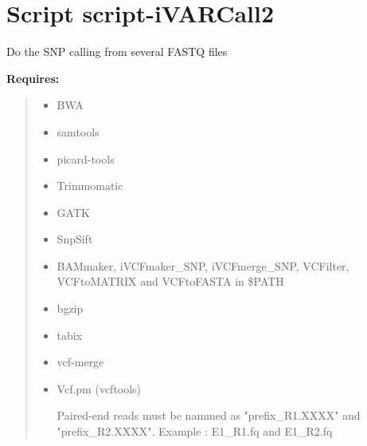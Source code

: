 %
%
%


\section{Script script-iVARCall2}

    \label{script-iVARCall2}
Do the SNP calling from several FASTQ files

\textbf{Requires:}
\begin{quote}
  \begin{itemize}

  \item
    \setlength{\parskip}{0.6ex}
BWA



  \item samtools



  \item picard-tools



  \item Trimmomatic



  \item GATK



  \item SnpSift



  \item BAMmaker, iVCFmaker\_SNP, iVCFmerge\_SNP, VCFilter, VCFtoMATRIX and 
VCFtoFASTA in \$PATH



  \item bgzip



  \item tabix



  \item vcf-merge



  \item Vcf.pm (vcftools)

Paired-end reads must be nammed as "prefix\_R1.XXXX" and "prefix\_R2.XXXX".
Example : E1\_R1.fq and E1\_R2.fq



\end{itemize}

\end{quote}


